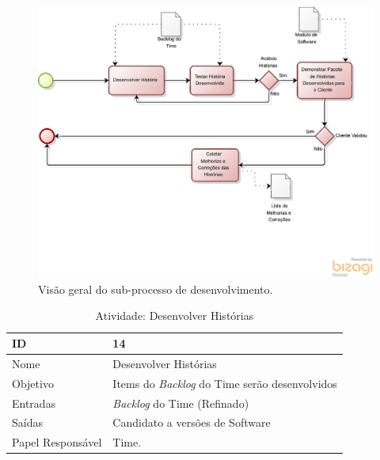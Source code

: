     \begin{figure}[H]
        \centering
      \includegraphics[keepaspectratio=true,scale=0.6]{figuras/desenvolves.eps}
        \caption{Visão geral do sub-processo de desenvolvimento.}
        \label{fig:gerencia}
    \end{figure}


    \begin{table}[H]
      \centering
        \begin{tabular}{| m{5em} | m{10cm} |}
          \hline
          ID       & 14   \\ \hline
          Nome     & Desenvolver Histórias  \\ \hline
          Objetivo & Items do \textit{Backlog} do Time serão desenvolvidos  \\ \hline
          Entradas & \textit{Backlog} do Time (Refinado)\\ \hline
          Saídas   & Candidato a versões de Software \\ \hline
          Papel Responsável   & Time. \\ \hline
        \end{tabular}
        \caption{Atividade: Desenvolver Histórias}
        \label{tabela:atividade14}
    \end{table}

